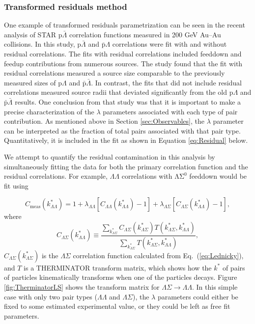 \subsubsection{Transformed residuals method}
\label{sec:TransformedResiduals}


One example of transformed residuals parametrization can be seen in the recent analysis \cite{Kisiel:2014mma} of STAR p$\bar{\Lambda}$ correlation functions measured in 200 GeV Au--Au collisions.  
In this study, p$\bar{\Lambda}$ and $\bar{\mathrm{p}}\Lambda$ correlations were fit with and without residual correlations.  
The fits with residual correlations included feeddown and feedup contributions from numerous sources.  
The study found that the fit with residual correlations measured a source size comparable to the previously measured sizes of p$\Lambda$ and $\bar{\mathrm{p}}\bar{\Lambda}$.  
In contrast, the fits that did not include residual correlations measured source radii that deviated significantly from the old p$\Lambda$ and $\bar{\mathrm{p}}\bar{\Lambda}$ results.  
One conclusion from that study was that it is important to make a precise characterization of the $\lambda$ parameters associated with each type of pair contribution.  
As mentioned above in Section \ref{sec:Observables}, the $\lambda$ parameter can be interpreted as the fraction of total pairs associated with that pair type.  
Quantitatively, it is included in the fit as shown in Equation \ref{eq:Residual} below.

We attempt to quantify the residual contamination in this analysis by simultaneously fitting the data for both the primary correlation function and the residual correlations.  
For example, $\Lambda\Lambda$ correlations with $\mathrm{\Lambda\Sigma^0}$ feeddown would be fit using 

\begin{equation}
\label{eq:Residual}
C_{\mathrm{meas}}(k^*_{\Lambda\Lambda})= 1 + \lambda_{\Lambda\Lambda}[C_{\Lambda\Lambda}(k^*_{\Lambda\Lambda})-1]+\lambda_{\Lambda\Sigma}[C_{\Lambda\Sigma}(k^*_{\Lambda\Lambda})-1],
\end{equation}
where $$C_{\Lambda\Sigma}(k^*_{\Lambda\Lambda}) \equiv \frac{\displaystyle\sum\limits_{k^*_{\Lambda\Sigma}}C_{\Lambda\Sigma}(k^*_{\Lambda\Sigma})T(k^*_{\Lambda\Sigma},k^*_{\Lambda\Lambda})}{\displaystyle\sum\limits_{k^*_{\Lambda\Sigma}}T(k^*_{\Lambda\Sigma},k^*_{\Lambda\Lambda})},$$ $C_{\Lambda\Sigma}(k^*_{\Lambda\Sigma})$ is the $\Lambda\Sigma$ correlation function calculated from Eq.~(\ref{eq:Lednicky}), and $T$ is a THERMINATOR \cite{Chojnacki:2011hb} transform matrix, which shows how the $k^*$ of pairs of particles kinematically transforms when one of the particles decays.  
Figure \ref{fig:TherminatorLS} shows the transform matrix for $\Lambda\Sigma \rightarrow \Lambda\Lambda$.  
In this simple case with only two pair types ($\Lambda\Lambda$ and $\Lambda\Sigma$), the $\lambda$ parameters could either be fixed to some estimated experimental value, or they could be left as free fit parameters.

